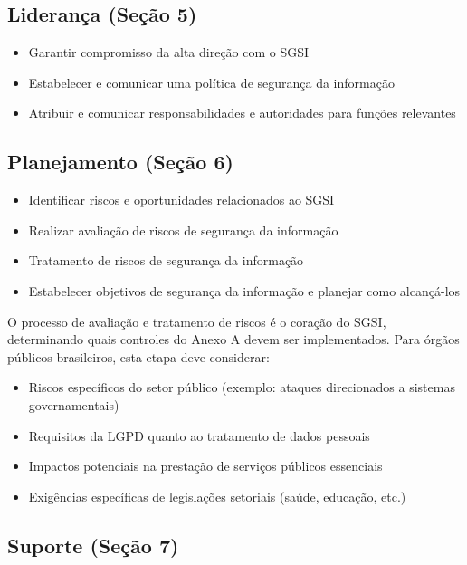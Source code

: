 \documentclass[12pt,a4paper]{report}
\begin{document}
\subsection{Liderança (Seção 5)}

\begin{itemize}
  \item Garantir compromisso da alta direção com o SGSI
  \item Estabelecer e comunicar uma política de segurança da informação
  \item Atribuir e comunicar responsabilidades e autoridades para funções relevantes
\end{itemize}

\subsection{Planejamento (Seção 6)}

\begin{itemize}
  \item Identificar riscos e oportunidades relacionados ao SGSI
  \item Realizar avaliação de riscos de segurança da informação
  \item Tratamento de riscos de segurança da informação
  \item Estabelecer objetivos de segurança da informação e planejar como alcançá-los
\end{itemize}

\begin{infobox}
O processo de avaliação e tratamento de riscos é o coração do SGSI, determinando quais controles do Anexo A devem ser implementados. Para órgãos públicos brasileiros, esta etapa deve considerar:

\begin{itemize}
  \item Riscos específicos do setor público (exemplo: ataques direcionados a sistemas governamentais)
  \item Requisitos da LGPD quanto ao tratamento de dados pessoais
  \item Impactos potenciais na prestação de serviços públicos essenciais
  \item Exigências específicas de legislações setoriais (saúde, educação, etc.)
\end{itemize}
\end{infobox}

\subsection{Suporte (Seção 7)}
\end{document}
